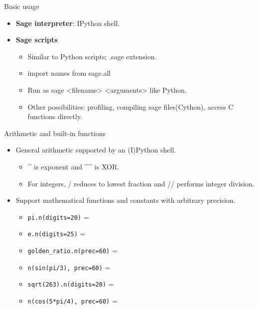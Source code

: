 \documentclass{beamer}
\begin{document}
\begin{frame}{Basic usage}
  \begin{itemize}
   \item \textbf{Sage interpreter}: IPython shell.
   \item \textbf{Sage scripts}
   \begin{itemize}
    \item Similar to Python scripts; .sage extension.
    \item import names from sage.all
    \item Run as sage <filename> <arguments> like Python.
    \item Other possibilities: profiling, compiling sage files(Cython), access C functions directly.
   \end{itemize}
  \end{itemize}
\end{frame}

\begin{frame}[fragile]{Arithmetic and built-in functions}
  \begin{itemize}
   \item General arithmetic supported by an (I)Python shell.
   \begin{itemize}
    \item \textasciicircum \hspace{0pt} is exponent and \textasciicircum\textasciicircum \hspace{0pt} is XOR.
    \item For integers, / reduces to lowest fraction and // performs integer division.
   \end{itemize}
   \item Support mathematical functions and constants with arbitrary precision.
   \begin{itemize}
    \item \verb+pi.n(digits=20)+ = 
    \item \verb+e.n(digits=25)+ = 
    \item \verb+golden_ratio.n(prec=60)+ = 
    \item \verb+n(sin(pi/3), prec=60)+ = 
    \item \verb+sqrt(263).n(digits=20)+ = 
    \item \verb+n(cos(5*pi/4), prec=60)+ = 
   \end{itemize}
  \end{itemize}
\end{frame}
\end{document}
